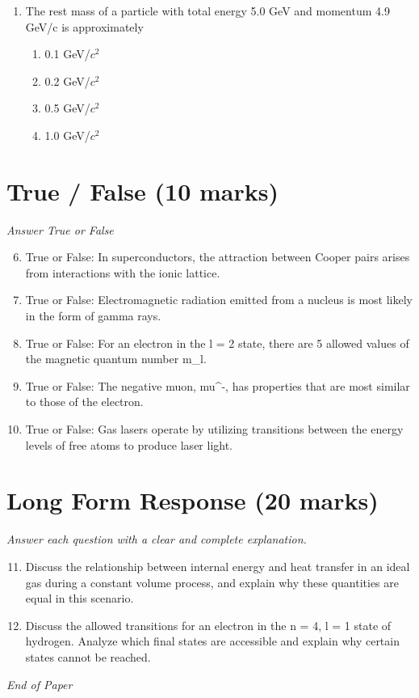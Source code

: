 \documentclass[12pt]{article}
\begin{document}
\begin{enumerate}[label=\arabic*.]
\begin{enumerate}[label=(\alph*)]
    \item mc/2
    \item mc/($2^(1$/2))
    \item mc
    \item ($3^(1$/2))mc
\end{enumerate}
\item The rest mass of a particle with total energy 5.0 GeV and momentum 4.9 GeV/c is approximately
\begin{enumerate}[label=(\alph*)]
    \item 0.1 GeV/$c^2$
    \item 0.2 GeV/$c^2$
    \item 0.5 GeV/$c^2$
    \item 1.0 GeV/$c^2$
\end{enumerate}
\end{enumerate}

\section*{True / False (10 marks)}
\textit{Answer True or False}
\begin{enumerate}[label=\arabic*.]
\setcounter{enumi}{5}
\item True or False: In superconductors, the attraction between Cooper pairs arises from interactions with the ionic lattice.
\item True or False: Electromagnetic radiation emitted from a nucleus is most likely in the form of gamma rays.
\item True or False: For an electron in the l = 2 state, there are 5 allowed values of the magnetic quantum number m\_l.
\item True or False: The negative muon, mu^-, has properties that are most similar to those of the electron.
\item True or False: Gas lasers operate by utilizing transitions between the energy levels of free atoms to produce laser light.
\end{enumerate}

\section*{Long Form Response (20 marks)}
\textit{Answer each question with a clear and complete explanation.}
\begin{enumerate}[label=\arabic*.]
\setcounter{enumi}{10}
\item Discuss the relationship between internal energy and heat transfer in an ideal gas during a constant volume process, and explain why these quantities are equal in this scenario.
\item Discuss the allowed transitions for an electron in the n = 4, l = 1 state of hydrogen. Analyze which final states are accessible and explain why certain states cannot be reached.
\end{enumerate}

\vfill
\noindent\textit{End of Paper}
\end{document}
